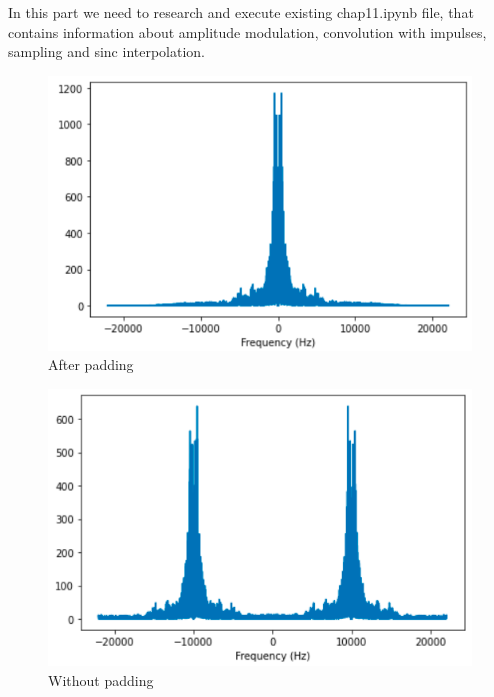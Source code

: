 \documentclass[a4paper]{article}
\begin{document}
        In this part we need to research and execute existing chap11.ipynb file, that contains information about amplitude modulation, convolution with impulses, sampling and sinc interpolation.
        
        \begin{figure}[H]
            \centering
            \includegraphics[width=\textwidth]{img/p1_1.png}
            \caption{After padding}
            \label{fig:p1_2}
        \end{figure}
        
        \begin{figure}[H]
            \centering
            \includegraphics[width=\textwidth]{img/p1_2.png}
            \caption{Without padding}
            \label{fig:p1_2}
        \end{figure}
        
\end{document}
